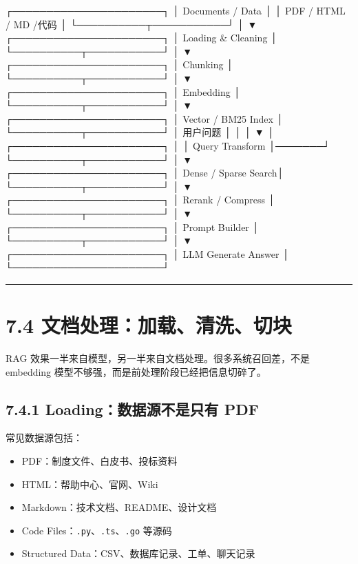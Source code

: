 \begin{codeblock}
                    ┌──────────────────────┐
                    │  Documents / Data    │
                    │ PDF / HTML / MD /代码 │
                    └──────────┬───────────┘
                               │
                               ▼
                    ┌──────────────────────┐
                    │ Loading & Cleaning   │
                    └──────────┬───────────┘
                               │
                               ▼
                    ┌──────────────────────┐
                    │ Chunking             │
                    └──────────┬───────────┘
                               │
                               ▼
                    ┌──────────────────────┐
                    │ Embedding            │
                    └──────────┬───────────┘
                               │
                               ▼
                    ┌──────────────────────┐
                    │ Vector / BM25 Index  │
                    └──────────┬───────────┘
                               │
      用户问题                 │
         │                     │
         ▼                     │
┌──────────────────────┐       │
│ Query Transform      │───────┘
└──────────┬───────────┘
           │
           ▼
┌──────────────────────┐
│ Dense / Sparse Search│
└──────────┬───────────┘
           │
           ▼
┌──────────────────────┐
│ Rerank / Compress    │
└──────────┬───────────┘
           │
           ▼
┌──────────────────────┐
│ Prompt Builder       │
└──────────┬───────────┘
           │
           ▼
┌──────────────────────┐
│ LLM Generate Answer  │
└──────────────────────┘
\end{codeblock}

\bigskip\hrule\bigskip

\section{7.4 文档处理：加载、清洗、切块}

RAG 效果一半来自模型，另一半来自文档处理。很多系统召回差，不是 embedding 模型不够强，而是前处理阶段已经把信息切碎了。


\subsection{7.4.1 Loading：数据源不是只有 PDF}

常见数据源包括：


\begin{itemize}[leftmargin=2em]
\item PDF：制度文件、白皮书、投标资料
\item HTML：帮助中心、官网、Wiki
\item Markdown：技术文档、README、设计文档
\item Code Files：\texttt{.py}、\texttt{.ts}、\texttt{.go} 等源码
\item Structured Data：CSV、数据库记录、工单、聊天记录
\end{itemize}

